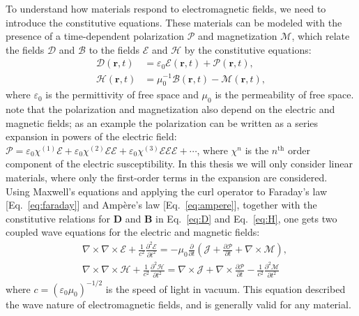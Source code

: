 To understand how materials respond to electromagnetic fields,
we need to introduce the constitutive equations. These materials can be modeled
with the presence of a time-dependent polarization $\bm{\mathcal{P}}$ and magnetization $\bm{\mathcal{M}}$, 
which relate the fields $\bm{\mathcal{D}}$ and $\bm{\mathcal{B}}$ to the fields $\bm{\mathcal{E}}$ and 
$\bm{\mathcal{H}}$ by the constitutive equations:
\begin{align}
    \bm{\mathcal{D}}(\mathbf{r}, t) &= \varepsilon_0 \bm{\mathcal{E}}(\mathbf{r}, t) + \bm{\mathcal{P}}(\mathbf{r}, t), \label{eq:D}\\ 
    \bm{\mathcal{H}}(\mathbf{r}, t) &= \mu_0^{-1} \bm{\mathcal{B}}(\mathbf{r}, t) - \bm{\mathcal{M}}(\mathbf{r}, t) \label{eq:H},
\end{align}
where $\varepsilon_0$ is the permittivity of free space and $\mu_0$ is the permeability of free space. 
note that the polarization and magnetization also depend on the electric and magnetic fields; as an example the
polarization can be written as a series expansion in powers of the electric field: 
$\bm{\mathcal{P}}=\mathcal{\varepsilon}_0 \bm{\mathcal{\chi}}^{(1)} \bm{\mathcal{E}}+\mathcal{\varepsilon}_0 \bm{\mathcal{\chi}}^{(2)} \bm{\mathcal{E}} \bm{\mathcal{E}}+\mathcal{\varepsilon}_0 \bm{\mathcal{\chi}}^{(3)} \bm{\mathcal{E}} \bm{\mathcal{E}} \bm{\mathcal{E}}+\cdots$,
where $\bm{\mathcal{\chi}}^{n}$ is the $n^\text{th}$ order component of the electric susceptibility. In this thesis
we will only consider linear materials, where only the first-order terms in the expansion are considered. \\


Using Maxwell's equations and applying the curl operator to Faraday's law [Eq.~\eqref{eq:faraday}] and Ampère's law [Eq.~\eqref{eq:ampere}], 
together with the constitutive relations for $\mathbf{D}$ and $\mathbf{B}$ in Eq.~\eqref{eq:D} and Eq.~\eqref{eq:H}, one gets two coupled
wave equations for the electric and magnetic fields:
\begin{equation}
\begin{aligned}
    & \nabla \times \nabla \times \bm{\mathcal{E}}+\frac{1}{c^2} \frac{\partial^2 \bm{\mathcal{E}}}{\partial t^2}=-\mu_0 \frac{\partial}{\partial t}\left(\bm{\mathcal{J}}+\frac{\partial \bm{\mathcal{P}}}{\partial t}+\nabla \times \bm{\mathcal{M}}\right), \\
    & \nabla \times \nabla \times \bm{\mathcal{H}}+\frac{1}{c^2} \frac{\partial^2 \bm{\mathcal{H}}}{\partial t^2}=\nabla \times \bm{\mathcal{J}}+\nabla \times \frac{\partial \bm{\mathcal{P}}}{\partial t}-\frac{1}{c^2} \frac{\partial^2 \bm{\mathcal{M}}}{\partial t^2}
\end{aligned}
\end{equation}
where $c=(\varepsilon_0 \mu_0)^{-1/2}$ is the speed of light in vacuum. This equation described the wave nature of electromagnetic fields,
and is generally valid for any material.

